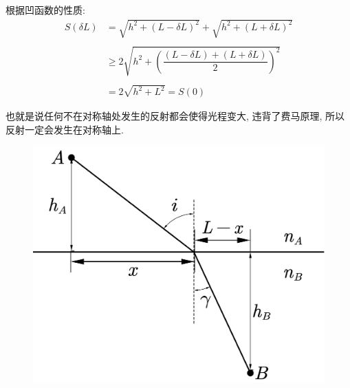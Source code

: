 \documentclass[12pt,a4paper]{article}
\begin{document}
	根据凹函数的性质:
	\begin{align}
		S(\delta L)&=\sqrt{h^2+\left(L-\delta L \right)^2 }+\sqrt{h^2+\left(L+\delta L \right)^2 }\nonumber
		\\\nonumber
		\\
		&\geqslant 2\sqrt{h^2+\left( \dfrac{\left( L-\delta L\right)+\left( L+\delta L\right)  }{2}\right)^ 2}\nonumber
		\\\nonumber
		\\
		&=2\sqrt{h^2+L^2}=S(0)\nonumber
	\end{align}
	
	也就是说任何不在对称轴处发生的反射都会使得光程变大, 违背了费马原理, 所以反射一定会发生在对称轴上.
	
	\begin{figure}[H]
		\centering
		\includegraphics[width=0.7\linewidth]{../LatePic/JSSSDL}
		\caption*{}
		\label{fig:jsssdl}
	\end{figure}
	
\end{document}
